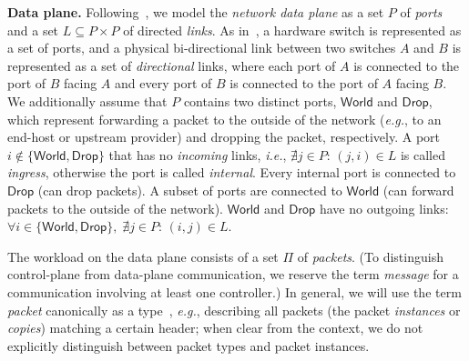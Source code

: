\documentclass[11pt,pdftex,letter]{article}
\newcommand{\eg}{{\it e.g.}}
\newcommand{\ie}{{\it i.e.}}
\newcommand{\mcnote}[1]{\textcolor{heraldBlue}{\small \bf [MC: #1]}}
\newcommand{\ssnote}[1]{\textcolor{heraldBlue}{\small \bf [SS: #1]}}
\newcommand{\pknote}[1]{\textcolor{heraldBlue}{\small \bf [PK: #1]}}
\newcommand{\mcnote}[1]{}
\newcommand{\ssnote}[1]{}
\newcommand{\pknote}[1]{}
\begin{document}
\vspace{1mm}\noindent\textbf{Data plane.}
%
Following~\cite{network-update}, we model the \emph{network data plane}
as a set $P$ of \emph{ports} and a set $L\subseteq P\times P$ of directed
\emph{links}.
As in~\cite{network-update}, a hardware switch is represented as
  a set of ports,  and a physical bi-directional link between two
  switches $A$ and $B$ is represented as a set of \emph{directional}
  links,  where each port of $A$ is connected to the port of $B$
  facing $A$ and every port of $B$ is connected to the port of $A$
  facing $B$.
We additionally assume that $P$ contains two distinct ports,
$\textsf{World}$ and $\textsf{Drop}$,     
which represent forwarding a packet to the outside of the network (\eg, to an end-host or upstream provider) and
dropping the packet, respectively. 
A port $i\notin\{\textsf{World},\textsf{Drop}\}$ that has no \emph{incoming} links, \ie, $\nexists j\in P$:
$(j,i)\in L$  is called \emph{ingress}, 
otherwise the port is called \emph{internal}.
Every internal port is connected to $\textsf{Drop}$ (can drop
packets). A subset of ports are connected to $\textsf{World}$ (can
forward packets to the outside of the network).
$\textsf{World}$ and $\textsf{Drop}$ have no outgoing links: $\forall
i\in \{\textsf{World},\textsf{Drop}\},\;\nexists j\in P$:
$(i,j)\in L$.


The workload on the data plane consists of a set $\Pi$ of \emph{packets}.
(To distinguish control-plane from data-plane communication,
we reserve the term \emph{message} for a communication involving at least one controller.)
In general, we will use the term \emph{packet} canonically as a type~\cite{network-update},
\eg, describing all packets (the packet \emph{instances} or \emph{copies}) matching a certain header;
when clear from the context, we do not explicitly distinguish between
packet types and packet instances.
%
\end{document}
